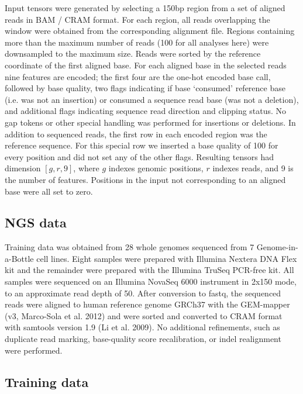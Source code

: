 \documentclass[]{article}
\begin{document}
Input tensors were generated by selecting a 150bp region from a set of aligned reads in BAM / CRAM format. For each region, all reads overlapping the window were obtained from the corresponding alignment file. Regions containing more than the maximum number of reads (100 for all analyses here) were downsampled to the maximum size.  Reads were sorted by the reference coordinate of the first aligned base. For each aligned base in the selected reads nine features are encoded; the first four are the one-hot encoded base call, followed by base quality, two flags indicating if base `consumed' reference base (i.e. was not an insertion) or consumed a sequence read base (was not a deletion), and additional flags indicating sequence read direction and clipping status.  No gap tokens or other special handling was performed for insertions or deletions. In addition to sequenced reads, the first row in each encoded region was the reference sequence. For this special row we inserted a base quality of 100 for every position and did not set any of the other flags. Resulting tensors had dimension $[g, r, 9]$, where $g$ indexes genomic positions, $r$ indexes reads, and 9 is the number of features. Positions in the input not corresponding to an aligned base were all set to zero. 


\subsection{NGS data}

Training data was obtained from 28 whole genomes sequenced from 7 Genome-in-a-Bottle cell lines. Eight samples were prepared with Illumina Nextera DNA Flex kit and the remainder were prepared with the Illumina TruSeq PCR-free kit. All samples were sequenced on an Illumina NovaSeq 6000 instrument in 2x150 mode, to an approximate read depth of 50. After conversion to fastq, the sequenced reads were aligned to human reference genome GRCh37 with the GEM-mapper (v3, Marco-Sola et al. 2012) and were sorted and converted to CRAM format with samtools version 1.9 (Li et al. 2009). No additional refinements, such as duplicate read marking, base-quality score recalibration, or indel realignment were performed.

\subsection{Training data}
\end{document}
